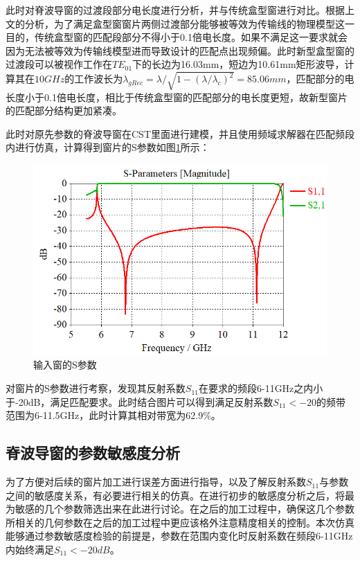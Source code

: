 \documentclass[master]{thesis-uestc}
\begin{document}
此时对脊波导窗的过渡段部分电长度进行分析，并与传统盒型窗进行对比。根据上文的分析，为了满足盒型窗窗片两侧过渡部分能够被等效为传输线的物理模型这一目的，传统盒型窗的匹配段部分不得小于0.1倍电长度。如果不满足这一要求就会因为无法被等效为传输线模型进而导致设计的匹配点出现频偏。此时新型盒型窗的过渡段可以被视作工作在$TE_{01}$下的长边为16.03mm，短边为10.61mm矩形波导，计算其在$10GHz$的工作波长为$\lambda_{gRec}=\lambda / \sqrt{1-(\lambda / \lambda_c)^2}=85.06mm$，匹配部分的电长度小于0.1倍电长度，相比于传统盒型窗的匹配部分的电长度更短，故新型窗片的匹配部分结构更加紧凑。

此时对原先参数的脊波导窗在CST里面进行建模，并且使用频域求解器在匹配频段内进行仿真，计算得到窗片的S参数如图\ref{fig:输入窗的S参数}所示：

\begin{figure}[!htb]
    \centering
    \includegraphics[width=0.5\linewidth]{pic/chapter3/脊波导窗S参数.png}
    \caption{输入窗的S参数}
    \label{fig:输入窗的S参数}
\end{figure}
对窗片的S参数进行考察，发现其反射系数$S_{11}$在要求的频段6-11GHz之内小于-20dB，满足匹配要求。此时结合图片可以得到满足反射系数$S_{11}<-20$的频带范围为6-11.5GHz，此时计算其相对带宽为62.9\%。

\subsection{脊波导窗的参数敏感度分析}\label{subsec:脊波导窗的参数敏感度分析}
为了方便对后续的窗片加工进行误差方面进行指导，以及了解反射系数\(S_{11}\)与参数之间的敏感度关系，有必要进行相关的仿真。在进行初步的敏感度分析之后，将最为敏感的几个参数筛选出来在此进行讨论。在之后的加工过程中，确保这几个参数所相关的几何参数在之后的加工过程中更应该格外注意精度相关的控制。本次仿真能够通过参数敏感度检验的前提是，参数在范围内变化时反射系数在频段6-11GHz内始终满足\(S_{11}<-20dB\)。
\end{document}
